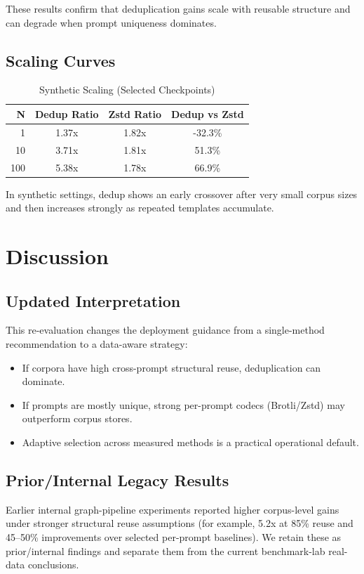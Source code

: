 \documentclass[10pt,conference]{IEEEtran}
\begin{document}
These results confirm that deduplication gains scale with reusable structure and can degrade when prompt uniqueness dominates.

\subsection{Scaling Curves}
\begin{table}[h]
\centering
\caption{Synthetic Scaling (Selected Checkpoints)}
\label{tab:synthetic_scaling}
\renewcommand{\arraystretch}{1.2}
\begin{tabular}{|r|c|c|c|}
\hline
\textbf{N} & \textbf{Dedup Ratio} & \textbf{Zstd Ratio} & \textbf{Dedup vs Zstd} \\
\hline
1 & 1.37x & 1.82x & -32.3\% \\
10 & 3.71x & 1.81x & 51.3\% \\
100 & 5.38x & 1.78x & 66.9\% \\
\hline
\end{tabular}
\end{table}

In synthetic settings, dedup shows an early crossover after very small corpus sizes and then increases strongly as repeated templates accumulate.

\section{Discussion}
\subsection{Updated Interpretation}
This re-evaluation changes the deployment guidance from a single-method recommendation to a data-aware strategy:
\begin{itemize}
    \item If corpora have high cross-prompt structural reuse, deduplication can dominate.
    \item If prompts are mostly unique, strong per-prompt codecs (Brotli/Zstd) may outperform corpus stores.
    \item Adaptive selection across measured methods is a practical operational default.
\end{itemize}

\subsection{Prior/Internal Legacy Results}
Earlier internal graph-pipeline experiments reported higher corpus-level gains under stronger structural reuse assumptions (for example, 5.2x at 85\% reuse and 45--50\% improvements over selected per-prompt baselines). We retain these as prior/internal findings and separate them from the current benchmark-lab real-data conclusions.
\end{document}
